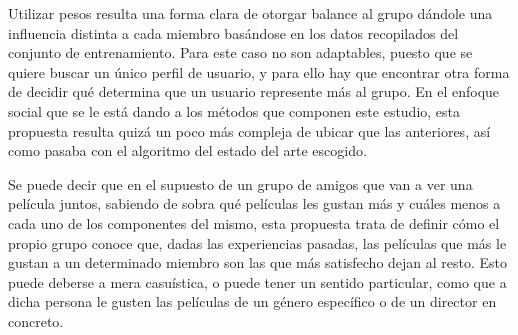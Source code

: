 Utilizar pesos resulta una forma clara de otorgar balance al grupo dándole una influencia distinta a cada miembro basándose en los datos recopilados del conjunto de entrenamiento. Para este caso no son adaptables, puesto que se quiere buscar un único perfil de usuario, y para ello hay que encontrar otra forma de decidir qué determina que un usuario represente más al grupo. En el enfoque social que se le está dando a los métodos que componen este estudio, esta propuesta resulta quizá un poco más compleja de ubicar que las anteriores, así como pasaba con el algoritmo del estado del arte escogido.

Se puede decir que en el supuesto de un grupo de amigos que van a ver una película juntos, sabiendo de sobra qué películas les gustan más y cuáles menos a cada uno de los componentes del mismo, esta propuesta trata de definir cómo el propio grupo conoce que, dadas las experiencias pasadas, las películas que más le gustan a un determinado miembro son las que más satisfecho dejan al resto. Esto puede deberse a mera casuística, o puede tener un sentido particular, como que a dicha persona le gusten las películas de un género específico o de un director en concreto.